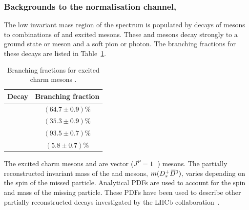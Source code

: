 \subsubsection{Backgrounds to the normalisation channel, \decay{\Bp}{\Dsp\Dzb}}
\label{sec:B2DsKK_norm_partreco}

The low invariant mass region of the \Dsp\Dzb spectrum is populated by decays of \Bp mesons to combinations of \D and excited \D mesons. These \Dstarzb and \Dss mesons decay strongly to a ground state \Dzb or \Dsp meson and a soft pion or photon. The branching fractions for these decays are listed in Table~\ref{tab:dstar_BFs}.


\begin{table}[h]
\centering
\begin{tabular}{ l c }

\hline
Decay                           & Branching fraction \\ 
\hline
\decay{\Dstarzb}{\Dzb\Pgamma}   &   $(64.7\pm0.9)\%$ \\
\decay{\Dstarzb}{\Dzb\piz}      &   $(35.3\pm0.9)\%$ \\
\decay{\Dssp}{\Dsp\Pgamma}      &   $(93.5\pm0.7)\%$ \\
\decay{\Dssp}{\Dsp\piz}         &    $(5.8\pm0.7)\%$ \\
\hline

\end{tabular}  
\caption{Branching fractions for excited charm mesons \cite{PDG2016}. } 
\label{tab:dstar_BFs}
\end{table}

The excited charm mesons \Dstarzb and \Dss are vector ($J^{P} = 1^{-}$) mesons. The partially reconstructed invariant mass of the \Dsp and \Dzb mesons, $m({{D}^+_{s}}{{\kern 0.2em\overline{\kern -0.2em D}{}}{}^0})$, varies depending on the spin of the missed particle.
Analytical PDFs are used to account for the spin and mass of the missing particle. These PDFs have been used to describe other partially reconstructed  decays investigated by the LHCb collaboration~\cite{LHCb-PAPER-2017-021}. 


